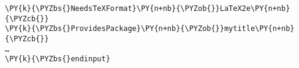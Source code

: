 \begin{Verbatim}[commandchars=\\\{\}]
\PY{k}{\PYZbs{}NeedsTeXFormat}\PY{n+nb}{\PYZob{}}LaTeX2e\PY{n+nb}{\PYZcb{}}
\PY{k}{\PYZbs{}ProvidesPackage}\PY{n+nb}{\PYZob{}}mytitle\PY{n+nb}{\PYZcb{}}
…
\PY{k}{\PYZbs{}endinput}
\end{Verbatim}
